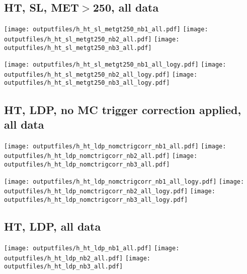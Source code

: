 \documentclass[11pt]{article}
\begin{document}
    \subsection{ HT, SL, MET$>$250, all data}

    \noindent
     \texttt{[image: outputfiles/h\_ht\_sl\_metgt250\_nb1\_all.pdf]}
     \texttt{[image: outputfiles/h\_ht\_sl\_metgt250\_nb2\_all.pdf]}
     \texttt{[image: outputfiles/h\_ht\_sl\_metgt250\_nb3\_all.pdf]}

    \noindent
     \texttt{[image: outputfiles/h\_ht\_sl\_metgt250\_nb1\_all\_logy.pdf]}
     \texttt{[image: outputfiles/h\_ht\_sl\_metgt250\_nb2\_all\_logy.pdf]}
     \texttt{[image: outputfiles/h\_ht\_sl\_metgt250\_nb3\_all\_logy.pdf]}











     \subsection{ HT, LDP, no MC trigger correction applied, all data}

    \noindent
     \texttt{[image: outputfiles/h\_ht\_ldp\_nomctrigcorr\_nb1\_all.pdf]}
     \texttt{[image: outputfiles/h\_ht\_ldp\_nomctrigcorr\_nb2\_all.pdf]}
     \texttt{[image: outputfiles/h\_ht\_ldp\_nomctrigcorr\_nb3\_all.pdf]}

    \noindent
     \texttt{[image: outputfiles/h\_ht\_ldp\_nomctrigcorr\_nb1\_all\_logy.pdf]}
     \texttt{[image: outputfiles/h\_ht\_ldp\_nomctrigcorr\_nb2\_all\_logy.pdf]}
     \texttt{[image: outputfiles/h\_ht\_ldp\_nomctrigcorr\_nb3\_all\_logy.pdf]}


    \subsection{ HT, LDP, all data}

    \noindent
     \texttt{[image: outputfiles/h\_ht\_ldp\_nb1\_all.pdf]}
     \texttt{[image: outputfiles/h\_ht\_ldp\_nb2\_all.pdf]}
     \texttt{[image: outputfiles/h\_ht\_ldp\_nb3\_all.pdf]}
\end{document}

